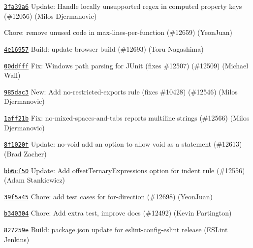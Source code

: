 \begin{DoxyItemize}
\item \href{https://github.com/eslint/eslint/commit/3fa39a633b37544fec7cedfc1f2b0e62e9312a72}{\texttt{ {\ttfamily 3fa39a6}}} Update\+: Handle locally unsupported regex in computed property keys (\#12056) (Milos Djermanovic)
\item \href{https://github.com/eslint/eslint/commit/474439720258b1a64b305c31588f803104fa4aaf}{\texttt{ {}}} Chore\+: remove unused code in max-\/lines-\/per-\/function (\#12659) (Yeon\+Juan)
\item \href{https://github.com/eslint/eslint/commit/4e169576a526023ee297d5bc8b37eedba229f63d}{\texttt{ {\ttfamily 4e16957}}} Build\+: update browser build (\#12693) (Toru Nagashima)
\item \href{https://github.com/eslint/eslint/commit/00ddfffe6b4b4244e4680b0f92f2c6697fad136f}{\texttt{ {\ttfamily 00ddfff}}} Fix\+: Windows path parsing for JUnit (fixes \#12507) (\#12509) (Michael Wall)
\item \href{https://github.com/eslint/eslint/commit/985dac35e3c367f0f99d1f0e766e06a1d9818dd4}{\texttt{ {\ttfamily 985dac3}}} New\+: Add no-\/restricted-\/exports rule (fixes \#10428) (\#12546) (Milos Djermanovic)
\item \href{https://github.com/eslint/eslint/commit/1aff21bb54da44cef0b6e378a34a74265863b930}{\texttt{ {\ttfamily 1aff21b}}} Fix\+: no-\/mixed-\/spaces-\/and-\/tabs reports multiline strings (\#12566) (Milos Djermanovic)
\item \href{https://github.com/eslint/eslint/commit/8f1020ff711b0c57d590bf666e2841f64186d083}{\texttt{ {\ttfamily 8f1020f}}} Update\+: no-\/void add an option to allow void as a statement (\#12613) (Brad Zacher)
\item \href{https://github.com/eslint/eslint/commit/bb6cf5082623ffb67bb1495fee52c0610ee5f421}{\texttt{ {\ttfamily bb6cf50}}} Update\+: Add offset\+Ternary\+Expressions option for indent rule (\#12556) (Adam Stankiewicz)
\item \href{https://github.com/eslint/eslint/commit/39f5a453579b2ad732212edeb71f84ecb0991f97}{\texttt{ {\ttfamily 39f5a45}}} Chore\+: add test cases for for-\/direction (\#12698) (Yeon\+Juan)
\item \href{https://github.com/eslint/eslint/commit/b3403045e535921df6d34785a4ce053e14ba27fd}{\texttt{ {\ttfamily b340304}}} Chore\+: Add extra test, improve docs (\#12492) (Kevin Partington)
\item \href{https://github.com/eslint/eslint/commit/827259ea009f98a0fdf3f7ebf1bfb6cd661ce28d}{\texttt{ {\ttfamily 827259e}}} Build\+: package.\+json update for eslint-\/config-\/eslint release (ESLint Jenkins)
\end{DoxyItemize}

